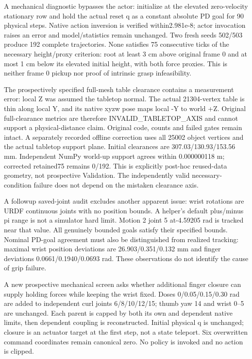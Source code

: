 \documentclass[10pt]{article}
\begin{document}
A mechanical diagnostic bypasses the actor: initialize at the elevated zero-velocity
stationary row and hold the actual reset q as a constant absolute PD goal for 90
physical steps. Native action inversion is verified within2.981e-8; actor invocation
raises an error and model/statistics remain unchanged. Two fresh seeds 502/503 produce
192 complete trajectories. None satisfies 75 consecutive ticks of the necessary
height/proxy criterion: root at least 3 cm above original frame 0 and at most 1 cm below
its elevated initial height, with both force proxies. This is neither frame 0 pickup
nor proof of intrinsic grasp infeasibility.

The prospectively specified full-mesh table clearance contains a measurement error:
local Z was assumed the tabletop normal. The actual 21304-vertex table is thin along
local Y, and its native xyzw pose maps local -Y to world +Z. Original full-clearance
metrics are therefore INVALID\_TABLETOP\_AXIS and cannot support a physical-distance
claim. Original code, counts and failed gates remain intact. A separately recorded
offline correction uses all 25002 object vertices and the actual tabletop support
plane. Initial clearances are 307.03/130.93/153.56 mm. Independent NumPy world-up support
agrees within 0.000000118 m; corrected retained75 remains 0/192. This is explicitly
post-hoc reused-data geometry, not prospective Validation. The independently valid
necessary-condition failure does not depend on the mistaken clearance axis.

A followup saved-joint audit excludes another apparent issue: wrist rotations are
URDF continuous joints with no position bounds. A helper's default plus/minus pi
range is not a simulator hard limit. Motion 2 joint 5 at-4.59205 rad is tracked near
that value. All genuinely bounded goals satisfy their specified bounds. Nominal
PD-goal agreement must also be distinguished from realized tracking: maximal wrist
position deviations are 26.903/0.351/0.132 mm and finger deviations 0.0661/0.1940/0.0693 rad.
These observations do not identify the cause of grip failure.

A new prospective mechanical screen asks whether additional finger closure can
supply holding forces while keeping the wrist fixed. Doses 0/0.05/0.15/0.30 rad are
added to independent curl joints 6/8/10/12/15; thumb yaw 14 and wrist 0--5 are unchanged.
Each parent is capped by both its own and dependent native limits, then dependent
coupling is reconstructed. Initial physical q is unchanged; closure is an actuator
target at the first step, not a state teleport. Six overwritten command coordinates
remain canonical zero. No policy is invoked and no action is clipped.
\end{document}
